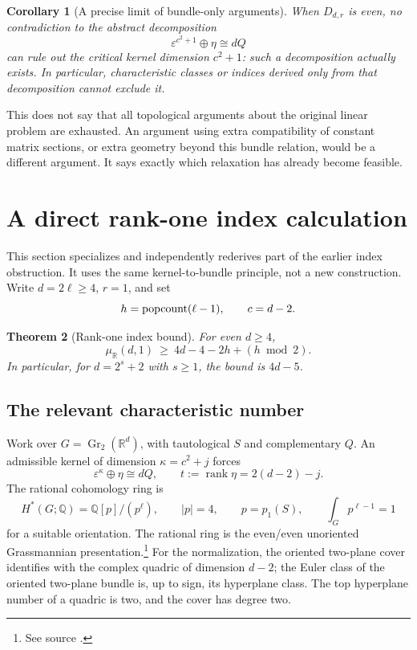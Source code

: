 \documentclass[11pt]{article}
\newtheorem{theorem}{Theorem}[section]
\newtheorem{corollary}[theorem]{Corollary}
\theoremstyle{remark}\newtheorem{remark}[theorem]{Remark}
\newcommand{\R}{\mathbb R}\newcommand{\C}{\mathbb C}\newcommand{\Q}{\mathbb Q}
\newcommand{\eps}{\varepsilon}\newcommand{\Gr}{\operatorname{Gr}}
\newcommand{\rank}{\operatorname{rank}}\newcommand{\ch}{\operatorname{ch}}
\newcommand{\fnref}[1]{\footnote{See source \cite{#1}.}}
\begin{document}
\begin{corollary}[A precise limit of bundle-only arguments]\label{limit}
When $D_{d,r}$ is even, no contradiction to the abstract decomposition
\[
 \eps^{c^2+1}\oplus\eta\cong dQ
\]
can rule out the critical kernel dimension $c^2+1$: such a decomposition
actually exists. In particular, characteristic classes or indices derived
only from that decomposition cannot exclude it.
\end{corollary}
This does not say that all topological arguments about the original linear
problem are exhausted. An argument using extra compatibility of constant
matrix sections, or extra geometry beyond this bundle relation, would be a
different argument. It says exactly which relaxation has already become
feasible.

\section{A direct rank-one index calculation}
This section specializes and independently rederives part of the earlier
index obstruction. It uses the same kernel-to-bundle principle, not a new
construction. Write $d=2\ell\ge4$, $r=1$, and set
\[
 h=\operatorname{popcount}(\ell-1),\qquad c=d-2.
\]

\begin{theorem}[Rank-one index bound]\label{rankone}
For even $d\ge4$,
\begin{equation}\label{rankonebound}
 \mu_\R(d,1)\ \ge\ 4d-4-2h+(h\bmod2).
\end{equation}
In particular, for $d=2^s+2$ with $s\ge1$, the bound is $4d-5$.
\end{theorem}

\subsection{The relevant characteristic number}
Work over $G=\Gr_2(\R^d)$, with tautological $S$ and complementary $Q$.
An admissible kernel of dimension $\kappa=c^2+j$ forces
\[
 \eps^{\kappa}\oplus\eta\cong dQ,
 \qquad t:=\rank\eta=2(d-2)-j.
\]
The rational cohomology ring is
\[
 H^*(G;\Q)=\Q[p]/(p^\ell),\qquad |p|=4,
 \qquad p=p_1(S),\qquad \int_G p^{\ell-1}=1
\]
for a suitable orientation. The rational ring is the even/even unoriented
Grassmannian presentation.\fnref{carlson} For the normalization, the oriented
two-plane cover identifies with the complex quadric of dimension $d-2$;
the Euler class of the oriented two-plane bundle is, up to sign, its
hyperplane class. The top hyperplane number of a quadric is two, and the
cover has degree two.
\end{document}
